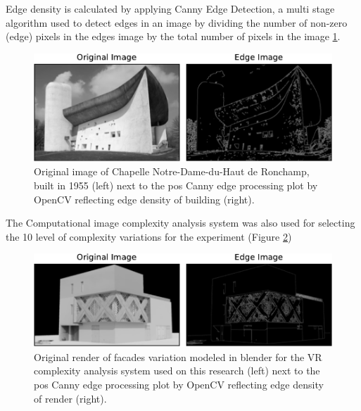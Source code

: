 Edge density is calculated by applying Canny Edge Detection\cite{OpenCV2023}, a multi stage algorithm used to detect edges in an image by dividing the number of non-zero (edge) pixels in the edges image by the total number of pixels in the image \ref{fig:CannyEdgePlotHistory}.

     \begin{figure}[htb]
          \centering
          \includegraphics[width= \linewidth]{Images/CannyEdgePlotHistory}
          \caption{Original image of Chapelle Notre-Dame-du-Haut de Ronchamp, built in 1955 (left) next to the pos Canny edge processing plot by OpenCV reflecting edge density of building (right).}
          \label{fig:CannyEdgePlotHistory}
        \end{figure}

The Computational image complexity analysis system was also used for selecting the 10 level of complexity variations for the experiment (Figure \ref{fig:CannyEdgePlotRender})

     \begin{figure}[htb]
          \centering
          \includegraphics[width= \linewidth]{Images/CannyEdgePlotRender}
          \caption{Original render of facades variation modeled in blender for the VR complexity analysis system used on this research (left) next to the pos Canny edge processing plot by OpenCV reflecting edge density of render (right).}
          \label{fig:CannyEdgePlotRender}
        \end{figure}

